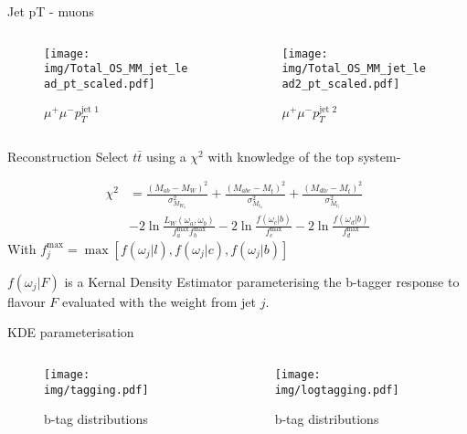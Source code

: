 \documentclass{beamer}
\begin{document}
\begin{frame}{Jet pT - muons}
  \begin{columns}
    \begin{column}{0.45\textwidth}\begin{figure}
      \caption{$\mu^{+}\mu^{-}$$p_{T}^{\text{jet 1}}$}
      \texttt{[image: img/Total\_OS\_MM\_jet\_lead\_pt\_scaled.pdf]}
    \end{figure}\end{column}
    \begin{column}{0.45\textwidth}\begin{figure}
      \caption{$\mu^{+}\mu^{-}$$p_{T}^{\text{jet 2}}$}
      \texttt{[image: img/Total\_OS\_MM\_jet\_lead2\_pt\_scaled.pdf]}
    \end{figure}\end{column}
  \end{columns}
\end{frame}

\begin{frame}{Reconstruction}
Select $t\bar{t}$ using a $\chi^2$ with knowledge of the top system-

\begin{equation}\begin{split}
  \chi^2 &= \frac{\left(M_{ab} - M_W\right)^2}{\sigma^2_{M_{W_h}}} + \frac{\left(M_{abc} - M_t\right)^2}{\sigma^2_{M_{t_h}}} + \frac{\left(M_{dl\nu} - M_t\right)^2}{\sigma^2_{M_{t_l}}} \\
  &-2\ln{\frac{L_{W}\left( \omega_{a},\omega_{b} \right)}{f^{\text{max}}_{a} f^{\text{max}}_{b}}} -2\ln{\frac{f\left(\omega_{c} \big| b\right)}{f^{\text{max}}_{c}}} -2\ln{\frac{f\left(\omega_{d} \big| b\right)}{f^{\text{max}}_{d}}}
\end{split}\end{equation}
With $f^{\text{max}}_j = \max\left[f\left(\omega_{j} \big| l\right), f\left(\omega_{j} \big| c\right), f\left(\omega_{j} \big| b\right)\right]$

$f\left( \omega_{j} \big| F\right)$ is a Kernal Density Estimator parameterising the b-tagger response to flavour $F$ evaluated with the weight from jet $j$.
\end{frame}

\begin{frame}{KDE parameterisation}
  \begin{columns}
    \begin{column}{0.45\textwidth}\begin{figure}
      \caption{b-tag distributions}
      \texttt{[image: img/tagging.pdf]}
    \end{figure}\end{column}
    \begin{column}{0.45\textwidth}\begin{figure}
      \caption{b-tag distributions}
      \texttt{[image: img/logtagging.pdf]}
    \end{figure}\end{column}
  \end{columns}
\end{frame}
\end{document}
